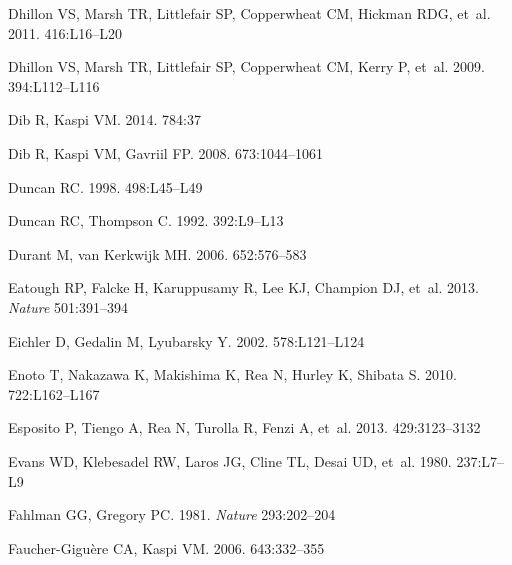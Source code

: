 \documentclass[letterpaper]{ar-1col}
\begin{document}
\begin{thebibliography}{}
{Dhillon} VS, {Marsh} TR, {Littlefair} SP, {Copperwheat} CM, {Hickman} RDG,
  et~al. 2011.
\textit{\mnras} 416:L16--L20

{Dhillon} VS, {Marsh} TR, {Littlefair} SP, {Copperwheat} CM, {Kerry} P, et~al.
  2009.
\textit{\mnras} 394:L112--L116

{Dib} R, {Kaspi} VM. 2014.
\textit{\apj} 784:37

{Dib} R, {Kaspi} VM, {Gavriil} FP. 2008.
\textit{\apj} 673:1044--1061

{Duncan} RC. 1998.
\textit{\apjl} 498:L45--L49

Duncan RC, Thompson C. 1992.
\textit{\apj} 392:L9--L13

{Durant} M, {van Kerkwijk} MH. 2006.
\textit{\apj} 652:576--583

{Eatough} RP, {Falcke} H, {Karuppusamy} R, {Lee} KJ, {Champion} DJ, et~al.
  2013.
\textit{Nature} 501:391--394

{Eichler} D, {Gedalin} M, {Lyubarsky} Y. 2002.
\textit{\apj} 578:L121--L124

{Enoto} T, {Nakazawa} K, {Makishima} K, {Rea} N, {Hurley} K, {Shibata} S. 2010.
\textit{\apjl} 722:L162--L167

{Esposito} P, {Tiengo} A, {Rea} N, {Turolla} R, {Fenzi} A, et~al. 2013.
\textit{\mnras} 429:3123--3132

Evans WD, Klebesadel RW, Laros JG, Cline TL, Desai UD, et~al. 1980.
\textit{\apj} 237:L7--L9

Fahlman GG, Gregory PC. 1981.
\textit{Nature} 293:202--204

Faucher-Gigu\`ere CA, Kaspi VM. 2006.
\textit{\apj} 643:332--355


\end{thebibliography}
\end{document}
